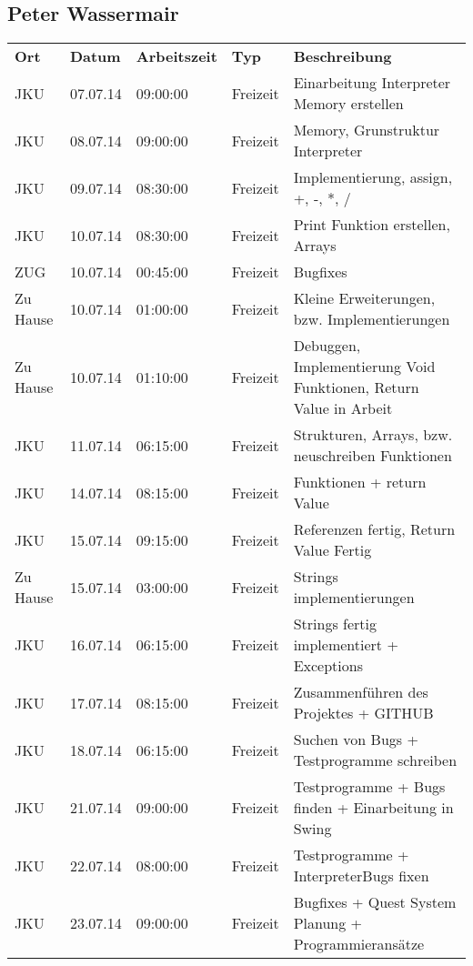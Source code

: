 \subsection{Peter Wassermair}

\begin{small}
\begin{longtable}{ p{} p{} p{} p{} p{}}
\textbf{Ort}	& \textbf{Datum}	& \textbf{Arbeitszeit}	& \textbf{Typ}	& \textbf{Beschreibung} \\
JKU	& 07.07.14	& 09:00:00	& Freizeit	& Einarbeitung Interpreter Memory erstellen \\
JKU	& 08.07.14	& 09:00:00	& Freizeit	& Memory, Grunstruktur Interpreter \\
JKU	& 09.07.14	& 08:30:00	& Freizeit	& Implementierung, assign, +, -, *, / \\
JKU	& 10.07.14	& 08:30:00	& Freizeit	& Print Funktion erstellen, Arrays \\
ZUG	& 10.07.14	& 00:45:00	& Freizeit	& Bugfixes \\
Zu Hause	& 10.07.14	& 01:00:00	& Freizeit	& Kleine Erweiterungen, bzw. Implementierungen \\
Zu Hause	& 10.07.14	& 01:10:00	& Freizeit	& Debuggen, Implementierung Void Funktionen, Return Value in Arbeit \\
JKU	& 11.07.14	& 06:15:00	& Freizeit	& Strukturen, Arrays, bzw. neuschreiben Funktionen \\
JKU	& 14.07.14	& 08:15:00	& Freizeit	& Funktionen + return Value \\
JKU	& 15.07.14	& 09:15:00	& Freizeit	& Referenzen fertig, Return Value Fertig \\
Zu Hause	& 15.07.14	& 03:00:00	& Freizeit	& Strings implementierungen \\
JKU	& 16.07.14	& 06:15:00	& Freizeit	& Strings fertig implementiert + Exceptions \\
JKU	& 17.07.14	& 08:15:00	& Freizeit	& Zusammenf\"uhren des Projektes + GITHUB \\
JKU	& 18.07.14	& 06:15:00	& Freizeit	& Suchen von Bugs + Testprogramme schreiben \\
JKU	& 21.07.14	& 09:00:00	& Freizeit	& Testprogramme + Bugs finden + Einarbeitung in Swing \\
JKU	& 22.07.14	& 08:00:00	& Freizeit	& Testprogramme + InterpreterBugs fixen \\
JKU	& 23.07.14	& 09:00:00	& Freizeit	& Bugfixes + Quest System Planung + Programmierans\"atze \\

\end{longtable}
\end{small}
